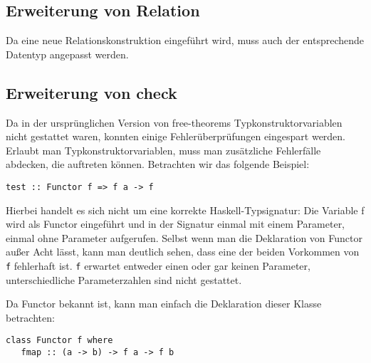 \subsection{Erweiterung von Relation}

Da eine neue Relationskonstruktion eingeführt wird, muss auch der entsprechende Datentyp angepasst werden.


\subsection{Erweiterung von check}

Da in der ursprünglichen Version von free-theorems Typkonstruktorvariablen nicht gestattet waren, konnten einige
Fehlerüberprüfungen eingespart werden. Erlaubt man Typkonstruktorvariablen, muss man zusätzliche Fehlerfälle abdecken,
die auftreten können. Betrachten wir das folgende Beispiel:

\begin{verbatim}
test :: Functor f => f a -> f
\end{verbatim}

Hierbei handelt es sich nicht um eine korrekte Haskell-Typsignatur: Die Variable f wird als Functor eingeführt und in der Signatur
einmal mit einem Parameter, einmal ohne Parameter aufgerufen. Selbst wenn man die Deklaration von Functor außer Acht lässt,
kann man deutlich sehen, dass eine der beiden Vorkommen von \texttt{f} fehlerhaft ist. \texttt{f} erwartet entweder einen
oder gar keinen Parameter, unterschiedliche Parameterzahlen sind nicht gestattet.

Da Functor bekannt ist, kann man einfach die Deklaration dieser Klasse betrachten:

\begin{verbatim}
class Functor f where
   fmap :: (a -> b) -> f a -> f b
\end{verbatim}


